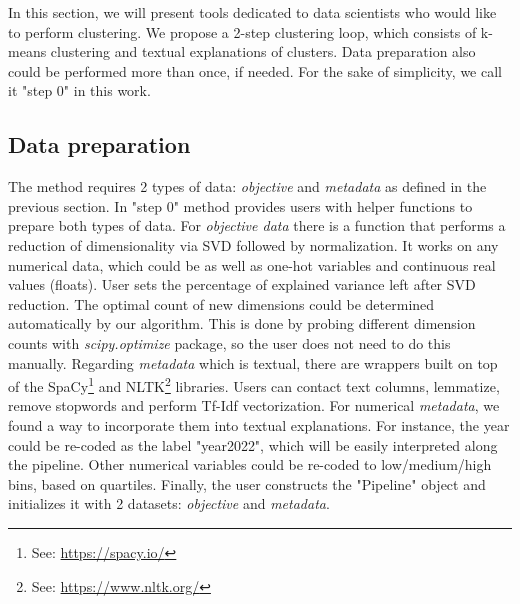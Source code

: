 \documentclass[
 twocolumn,
 hf,
]{ceurart}
\begin{document}
In this section, we will present tools dedicated to data scientists who would like to perform clustering.
We propose a 2-step clustering loop, which consists of k-means clustering and textual explanations of clusters.
Data preparation also could be performed more than once, if needed.
For the sake of simplicity, we call it "step 0" in this work.

\subsection{Data preparation}\label{subsec:data-preparation}
The method requires 2 types of data: \textit{objective} and \textit{metadata} as defined in the previous section.
In "step 0" method provides users with helper functions to prepare both types of data.
For \textit{objective data} there is a function that performs a reduction of dimensionality via SVD followed by normalization.
It works on any numerical data, which could be as well as one-hot variables and continuous real values (floats).
User sets the percentage of explained variance left after SVD reduction.
The optimal count of new dimensions could be determined automatically by our algorithm.
This is done by probing different dimension counts with \textit{scipy.optimize} package, so the user does not need to do this manually.
Regarding \textit{metadata} which is textual, there are wrappers built on top of the SpaCy\footnote{See: \url{https://spacy.io/}} and NLTK\footnote{See: \url{https://www.nltk.org/}} libraries.
Users can contact text columns, lemmatize, remove stopwords and perform Tf-Idf vectorization.
For numerical \textit{metadata}, we found a way to incorporate them into textual explanations.
For instance, the year could be re-coded as the label "year2022", which will be easily interpreted along the pipeline.
Other numerical variables could be re-coded to low/medium/high bins, based on quartiles.
Finally, the user constructs the "Pipeline" object and initializes it with 2 datasets: \textit{objective} and \textit{metadata}.
\end{document}
